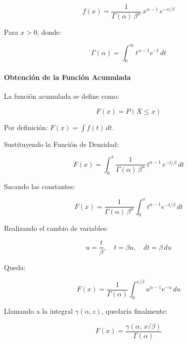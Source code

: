 \documentclass{article}
\begin{document}
\begin{equation}
    f(x) = \frac{1}{\Gamma(\alpha)\,\beta^{\alpha}}\, x^{\alpha - 1}\, e^{-x/\beta}
\end{equation}

Para $x > 0$, donde:

\begin{equation}
    \Gamma(\alpha) = \int_0^{\infty} t^{\alpha - 1} e^{-t}\, dt
\end{equation}

\paragraph{Obtención de la Función Acumulada}

La función acumulada se define como:

\begin{equation}
    F(x) = P(X \leq x)
\end{equation}

Por definición: $F(x) = \int f(t)\,dt$.

Sustituyendo la Función de Densidad:

\begin{equation}
    F(x) = \int_0^{x} \frac{1}{\Gamma(\alpha)\,\beta^{\alpha}}\, t^{\alpha - 1}\, e^{-t/\beta}\, dt
\end{equation}

Sacando las constantes:

\begin{equation}
    F(x) = \frac{1}{\Gamma(\alpha)\,\beta^{\alpha}} \int_0^{x} t^{\alpha - 1} e^{-t/\beta}\, dt
\end{equation}

Realizando el cambio de variables:

\begin{equation}
    u = \frac{t}{\beta}, \quad t = \beta u, \quad dt = \beta\, du
\end{equation}

Queda:

\begin{equation}
    F(x) = \frac{1}{\Gamma(\alpha)} \int_0^{x/\beta} u^{\alpha - 1} e^{-u}\, du
\end{equation}

Llamando a la integral $\gamma(\alpha, z)$, quedaría finalmente:

\begin{equation}
    F(x) = \frac{\gamma\!\left(\alpha,\, x/\beta\right)}{\Gamma(\alpha)}
\end{equation}
\end{document}
